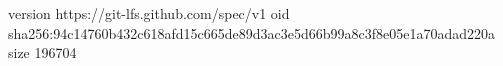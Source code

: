 version https://git-lfs.github.com/spec/v1
oid sha256:94c14760b432c618afd15c665de89d3ac3e5d66b99a8c3f8e05e1a70adad220a
size 196704
